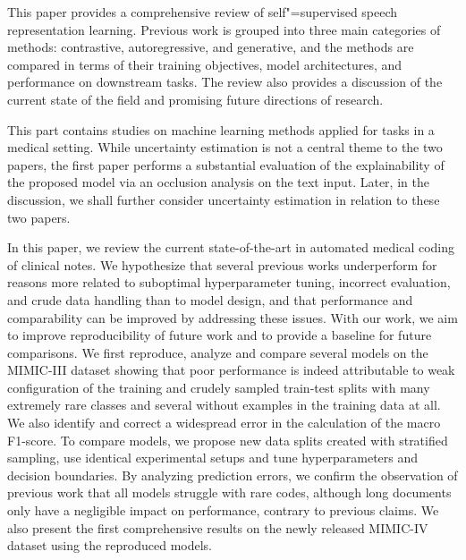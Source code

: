 This paper provides a comprehensive review of self"=supervised speech representation learning. Previous work is grouped into three main categories of methods: contrastive, autoregressive, and generative, and the methods are compared in terms of their training objectives, model architectures, and performance on downstream tasks. The review also provides a discussion of the current state of the field and promising future directions of research. 



 
This part contains studies on machine learning methods applied for tasks in a medical setting. While uncertainty estimation is not a central theme to the two papers, the first paper performs a substantial evaluation of the explainability of the proposed model via an occlusion analysis on the text input. Later, in the discussion, we shall further consider uncertainty estimation in relation to these two papers.

In this paper, we review the current state-of-the-art in automated medical coding of clinical notes. 
We hypothesize that several previous works underperform for reasons more related to suboptimal hyperparameter tuning, incorrect evaluation, and crude data handling than to model design, and that performance and comparability can be improved by addressing these issues. 
With our work, we aim to improve reproducibility of future work and to provide a baseline for future comparisons. 
We first reproduce, analyze and compare several models on the MIMIC-III dataset showing that poor performance is indeed attributable to weak configuration of the training and crudely sampled train-test splits with many extremely rare classes and several without examples in the training data at all. 
We also identify and correct a widespread error in the calculation of the macro F1-score. 
To compare models, we propose new data splits created with stratified sampling, use identical experimental setups and tune hyperparameters and decision boundaries. 
By analyzing prediction errors, we confirm the observation of previous work that all models struggle with rare codes, although long documents only have a negligible impact on performance, contrary to previous claims. 
We also present the first comprehensive results on the newly released MIMIC-IV dataset using the reproduced models. 

